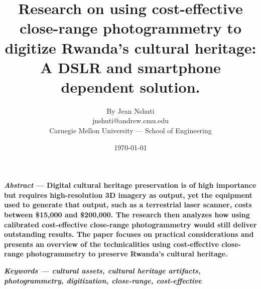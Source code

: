 \documentclass[conference]{IEEEtran}
\begin{document}
\title{\Large{\textbf{Research on using cost-effective close-range photogrammetry to digitize Rwanda’s cultural heritage: A DSLR and smartphone dependent
solution.}}}
\author{By Jean Nshuti \\ jnshuti@andrew.cmu.edu \\ Carnegie Mellon University — School of Engineering}
\date{\today}
\maketitle


\textbf{\textit{Abstract} — Digital cultural heritage preservation is of high importance but requires high-resolution 3D imagery as output, yet the equipment used to generate that output, such as a terrestrial laser scanner, costs between \$15,000 and \$200,000. The research then analyzes how using calibrated cost-effective close-range photogrammetry would still deliver outstanding results. The paper focuses on practical considerations and presents an overview of the technicalities using cost-effective close-range photogrammetry to preserve Rwanda’s cultural heritage. \\}

\textbf{\textit{Keywords — cultural assets, cultural heritage artifacts, photogrammetry, digitization, close-range, cost-effective}}
\end{document}
